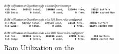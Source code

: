 \begin{figure}
    \centering
    \includegraphics[width=0.85\linewidth,  height=2cm]{figs/SnortRam.png}
    \caption{Ram Utilization on the \nodename}
    \label{fig:ramutil}
\end{figure}

